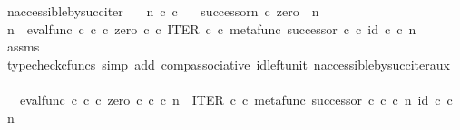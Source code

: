 \begin{isabellebody}
\isamarkupfalse%
%
\endisatagproof
{\isafoldproof}%
%
\isadelimproof
\isanewline
%
\endisadelimproof
\isanewline
{}\isamarkupfalse%
\ n{\isacharunderscore}{\kern0pt}accessible{\isacharunderscore}{\kern0pt}by{\isacharunderscore}{\kern0pt}succ{\isacharunderscore}{\kern0pt}iter{\isacharcolon}{\kern0pt}\isanewline
\ \ \ {\isachardoublequoteopen}n\ {\isasymin}\isactrlsub c\ {\isasymnat}\isactrlsub c{\isachardoublequoteclose}\isanewline
\ \ \ {\isachardoublequoteopen}{\isacharparenleft}{\kern0pt}successor\isactrlbsup {\isasymcirc}n\isactrlesup {\isacharparenright}{\kern0pt}\ {\isasymcirc}\isactrlsub c\ zero\ {\isacharequal}{\kern0pt}\ n{\isachardoublequoteclose}\isanewline
%
\isadelimproof
%
\endisadelimproof
%
\isatagproof
{}\isamarkupfalse%
\ {\isacharminus}{\kern0pt}\ \isanewline
\ \ \isamarkupfalse%
\ {\isachardoublequoteopen}n\ {\isacharequal}{\kern0pt}\ eval{\isacharunderscore}{\kern0pt}func\ {\isasymnat}\isactrlsub c\ {\isasymnat}\isactrlsub c\ {\isasymcirc}\isactrlsub c\ {\isasymlangle}zero\ {\isasymcirc}\isactrlsub c\ {\isasymbeta}\isactrlbsub {\isasymnat}\isactrlsub c\isactrlesub {\isacharcomma}{\kern0pt}\ ITER\ {\isasymnat}\isactrlsub c\ {\isasymcirc}\isactrlsub c\ {\isasymlangle}metafunc\ successor\ {\isasymcirc}\isactrlsub c\ {\isasymbeta}\isactrlbsub {\isasymnat}\isactrlsub c\isactrlesub {\isacharcomma}{\kern0pt}\ id\ {\isasymnat}\isactrlsub c{\isasymrangle}{\isasymrangle}\ {\isasymcirc}\isactrlsub c\ n{\isachardoublequoteclose}\isanewline
\ \ \ \ \isamarkupfalse%
\ assms\ \isamarkupfalse%
\ {\isacharparenleft}{\kern0pt}typecheck{\isacharunderscore}{\kern0pt}cfuncs{\isacharcomma}{\kern0pt}\ simp\ add{\isacharcolon}{\kern0pt}\ comp{\isacharunderscore}{\kern0pt}associative{}\ id{\isacharunderscore}{\kern0pt}left{\isacharunderscore}{\kern0pt}unit{}\ n{\isacharunderscore}{\kern0pt}accessible{\isacharunderscore}{\kern0pt}by{\isacharunderscore}{\kern0pt}succ{\isacharunderscore}{\kern0pt}iter{\isacharunderscore}{\kern0pt}aux{\isacharparenright}{\kern0pt}\isanewline
\ \ \isamarkupfalse%
\ \isamarkupfalse%
\ {\isachardoublequoteopen}{\isachardot}{\kern0pt}{\isachardot}{\kern0pt}{\isachardot}{\kern0pt}\ {\isacharequal}{\kern0pt}\ eval{\isacharunderscore}{\kern0pt}func\ {\isasymnat}\isactrlsub c\ {\isasymnat}\isactrlsub c\ {\isasymcirc}\isactrlsub c\ {\isasymlangle}zero\ {\isasymcirc}\isactrlsub c\ {\isasymbeta}\isactrlbsub {\isasymnat}\isactrlsub c\isactrlesub \ {\isasymcirc}\isactrlsub c\ n\ {\isacharcomma}{\kern0pt}\ ITER\ {\isasymnat}\isactrlsub c\ {\isasymcirc}\isactrlsub c\ {\isasymlangle}metafunc\ successor\ {\isasymcirc}\isactrlsub c\ {\isasymbeta}\isactrlbsub {\isasymnat}\isactrlsub c\isactrlesub \ {\isasymcirc}\isactrlsub c\ n{\isacharcomma}{\kern0pt}\ id\ {\isasymnat}\isactrlsub c\ {\isasymcirc}\isactrlsub c\ n{\isasymrangle}{\isasymrangle}{\isachardoublequoteclose}\isanewline

\end{isabellebody}
